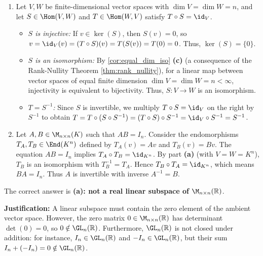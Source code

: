\begin{exercisesolution}
\label{sol:one_sided_inverse_finite_dim}
\begin{enumerate}[label=\textbf{(\alph*)}]
    \item Let $V, W$ be finite-di\-men\-sional vector spaces with $\dim V = \dim W = n$, and let $S \in \Hom(V, W)$ and $T \in \Hom(W, V)$ satisfy $T \circ S = \id_V$.
    \begin{itemize}
        \item \emph{$S$ is injective:} If $v \in \ker(S)$, then $S(v) = 0$, so $v = \id_V(v) = (T \circ S)(v) = T(S(v)) = T(0) = 0$. Thus, $\ker(S) = \{0\}$.
        \item \emph{$S$ is an isomorphism:} By \cref{cor:equal_dim_iso} \textbf{(c)} (a consequence of the Rank-Nullity Theorem \cref{thm:rank_nullity}), for a linear map between vector spaces of equal finite dimension $\dim V = \dim W = n < \infty$, injectivity is equivalent to bijectivity. Thus, $S \colon V \to W$ is an isomorphism.
        \item \emph{$T = S^{-1}$:} Since $S$ is invertible, we multiply $T \circ S = \id_V$ on the right by $S^{-1}$ to obtain $T = T \circ (S \circ S^{-1}) = (T \circ S) \circ S^{-1} = \id_V \circ S^{-1} = S^{-1}$.
    \end{itemize}

    \item Let $A, B \in \M_{n \times n}(K)$ such that $AB = I_n$.
    Consider the endomorphisms $T_A, T_B \in \End(K^n)$ defined by $T_A(v) = Av$ and $T_B(v) = Bv$.
    The equation $AB = I_n$ implies $T_A \circ T_B = \id_{K^n}$.
    By part \textbf{(a)} (with $V = W = K^n$), $T_B$ is an isomorphism with $T_B^{-1} = T_A$.
    Hence $T_B \circ T_A = \id_{K^n}$, which means $BA = I_n$.
    Thus $A$ is invertible with inverse $A^{-1} = B$. \qedhere
\end{enumerate}
\end{exercisesolution}

\begin{exercisesolution*}
\label{sol:gl_not_subspace_sc}
The correct answer is \textbf{(a): not a real linear subspace of $\M_{n \times n}(\mathbb{R})$}.

\textbf{Justification:} A linear subspace must contain the zero element of the ambient vector space.
However, the zero matrix $0 \in \M_{n \times n}(\mathbb{R})$ has determinant $\det(0) = 0$, so $0 \notin \GL_n(\mathbb{R})$.
Furthermore, $\GL_n(\mathbb{R})$ is not closed under addition: for instance, $I_n \in \GL_n(\mathbb{R})$ and $-I_n \in \GL_n(\mathbb{R})$, but their sum $I_n + (-I_n) = 0 \notin \GL_n(\mathbb{R})$. \qedhere
{}
\end{exercisesolution*}
